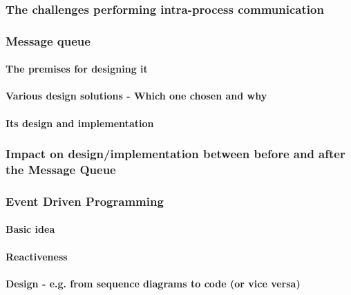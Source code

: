 \subsubsection{The challenges performing intra-process communication}


\subsubsection{Message queue}

\paragraph{The premises for designing it}

\paragraph{Various design solutions - Which one chosen and why}

\paragraph{Its design and implementation}

\subsubsection{Impact on design/implementation between before and after the Message Queue}

\subsubsection{Event Driven Programming}

\paragraph{Basic idea}

\paragraph{Reactiveness}

\paragraph{Design - e.g. from sequence diagrams to code (or vice versa)}
